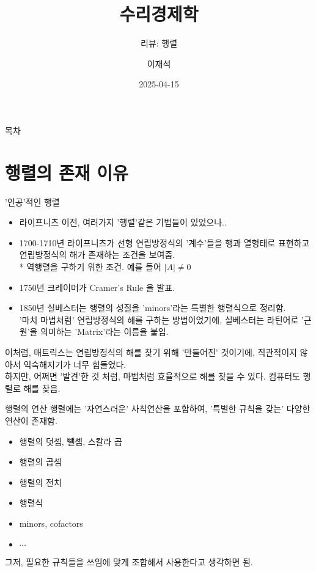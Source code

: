 \documentclass[aspectratio=169]{beamer}
\title{수리경제학}
\subtitle{리뷰: 행렬}
\author{이재석}
\date{2025-04-15}
\begin{document}
\begin{frame}
  \titlepage
\end{frame}

\begin{frame}{목차}
  \tableofcontents
\end{frame}


\section{행렬의 존재 이유}
\begin{frame}{'인공'적인 행렬}
  \begin{itemize}
    \item 라이프니츠 이전, 여러가지 '행렬'같은 기법들이 있었으나..
    \item 1700-1710년 라이프니츠가 선형 연립방정식의 '계수'들을 행과 열형태로 표현하고 연립방정식의 해가 존재하는 조건을 보여줌. \\ %
    * 역행렬을 구하기 위한 조건. 예를 들어 $ \left| A \right| \neq 0$
    \item 1750년 크레이머가 Cramer's Rule 을 발표.
    \item 1850년 실베스터는 행렬의 성질을 'minors'라는 특별한 행렬식으로 정리함. \\
      '마치 마법처럼' 연립방정식의 해를 구하는 방법이었기에, 실베스터는 라틴어로 '근원'을 의미하는 'Matrix'라는 이름을 붙임.
  \end{itemize}
  \vspace{10pt}
  이처럼, 매트릭스는 연립방정식의 해를 찾기 위해 '만들어진' 것이기에, 직관적이지 않아서 익숙해지기가 너무 힘들었다. \\
  하지만, 어쩌면 '발견'한 것 처럼, 마법처럼 효율적으로 해를 찾을 수 있다. 컴퓨터도 행렬로 해를 찾음.
\end{frame}


\begin{frame}{행렬의 연산 }
  행렬에는 '자연스러운' 사칙연산을 포함하여, '특별한 규칙을 갖는' 다양한 연산이 존재함. \\
  \begin{itemize}
    \item 행렬의 덧셈, 뺄셈, 스칼라 곱 
    \item 행렬의 곱셈 
    \item 행렬의 전치
    \item 행렬식
    \item minors, cofactors
    \item $\cdots$
  \end{itemize}
  그저, 필요한 규칙들을 쓰임에 맞게 조합해서 사용한다고 생각하면 됨.
\end{frame}
\end{document}
